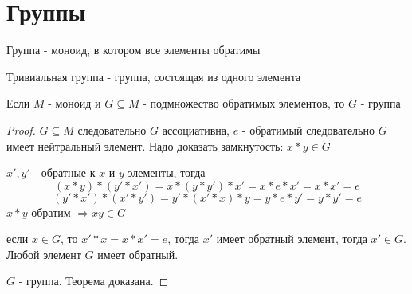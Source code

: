 \documentclass[../main/document.tex]{subfiles}
\begin{document}
\section{Группы}
\begin{dfn}
Группа - моноид, в котором все элементы обратимы
\end{dfn}
\begin{dfn}
Тривиальная группа - группа, состоящая из одного элемента
\end{dfn}
\begin{thm}
Если $M$ - моноид и $G\subseteq M$ - подмножество обратимых элементов, то $G$ - группа
\begin{proof}

$G\subseteq M$ следовательно $G$ ассоциативна, 
$e$ - обратимый следовательно $G$ имеет нейтральный элемент. 
Надо доказать замкнутость: $x*y\in G$

$x',y'$ - обратные к $x$ и $y$ элементы, тогда
$$(x*y)*(y'*x')=x*(y*y')*x'=x*e*x'=x*x'=e$$
$$(y'*x')*(x'*y')=y'*(x'*x)*y=y*e*y'=y*y'=e$$
$x*y$ обратим $\Rightarrow xy\in G$

если $x\in G$, то $x'*x=x*x'=e$, тогда $x'$  имеет обратный элемент, тогда $x'\in G$. Любой элемент $G$ имеет обратный.

$G$ - группа. Теорема доказана.

\end{proof}
\end{thm}
\end{document}
